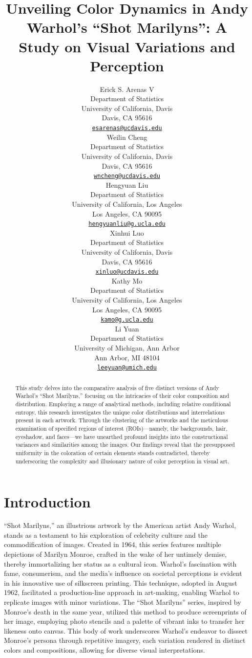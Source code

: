 \documentclass{article}
\title{Unveiling Color Dynamics in Andy Warhol's ``Shot Marilyns'': A
Study on Visual Variations and Perception}
\author{
    Erick S. Arenas V
   \\
    Department of Statistics \\
    University of California, Davis \\
  Davis, CA 95616 \\
  \texttt{\href{mailto:esarenas@ucdavis.edu}{\nolinkurl{esarenas@ucdavis.edu}}} \\
   \And
    Weilin Cheng
   \\
    Department of Statistics \\
    University of California, Davis \\
  Davis, CA 95616 \\
  \texttt{\href{mailto:wncheng@ucdavis.edu}{\nolinkurl{wncheng@ucdavis.edu}}} \\
   \And
    Hengyuan Liu
   \\
    Department of Statistics \\
    University of California, Los Angeles \\
  Los Angeles, CA 90095 \\
  \texttt{\href{mailto:hengyuanliu@g.ucla.edu}{\nolinkurl{hengyuanliu@g.ucla.edu}}} \\
   \And
    Xinhui Luo
   \\
    Department of Statistics \\
    University of California, Davis \\
  Davis, CA 95616 \\
  \texttt{\href{mailto:xinluo@ucdavis.edu}{\nolinkurl{xinluo@ucdavis.edu}}} \\
   \And
    Kathy Mo
   \\
    Department of Statistics \\
    University of California, Los Angeles \\
  Los Angeles, CA 90095 \\
  \texttt{\href{mailto:kamo@g.ucla.edu}{\nolinkurl{kamo@g.ucla.edu}}} \\
   \And
    Li Yuan
   \\
    Department of Statistics \\
    University of Michigan, Ann Arbor \\
  Ann Arbor, MI 48104 \\
  \texttt{\href{mailto:leeyuan@umich.edu}{\nolinkurl{leeyuan@umich.edu}}} \\
  }
\begin{document}
\maketitle


\begin{abstract}
This study delves into the comparative analysis of five distinct
versions of Andy Warhol's ``Shot Marilyns,'' focusing on the intricacies
of their color composition and distribution. Employing a range of
analytical methods, including relative conditional entropy, this
research investigates the unique color distributions and interrelations
present in each artwork. Through the clustering of the artworks and the
meticulous examination of specified regions of interest (ROIs)---namely,
the backgrounds, hair, eyeshadow, and faces---we have unearthed profound
insights into the constructional variances and similarities among the
images. Our findings reveal that the presupposed uniformity in the
coloration of certain elements stands contradicted, thereby underscoring
the complexity and illusionary nature of color perception in visual art.
\end{abstract}


\hypertarget{introduction}{%
\section{Introduction}\label{introduction}}

``Shot Marilyns,'' an illustrious artwork by the American artist Andy
Warhol, stands as a testament to his exploration of celebrity culture
and the commodification of images. Created in 1964, this series features
multiple depictions of Marilyn Monroe, crafted in the wake of her
untimely demise, thereby immortalizing her status as a cultural icon.
Warhol's fascination with fame, consumerism, and the media's influence
on societal perceptions is evident in his innovative use of silkscreen
printing. This technique, adopted in August 1962, facilitated a
production-line approach in art-making, enabling Warhol to replicate
images with minor variations. The ``Shot Marilyns'' series, inspired by
Monroe's death in the same year, utilized this method to produce
screenprints of her image, employing photo stencils and a palette of
vibrant inks to transfer her likeness onto canvas. This body of work
underscores Warhol's endeavor to dissect Monroe's persona through
repetitive imagery, each variation rendered in distinct colors and
compositions, allowing for diverse visual interpretations.
\end{document}

